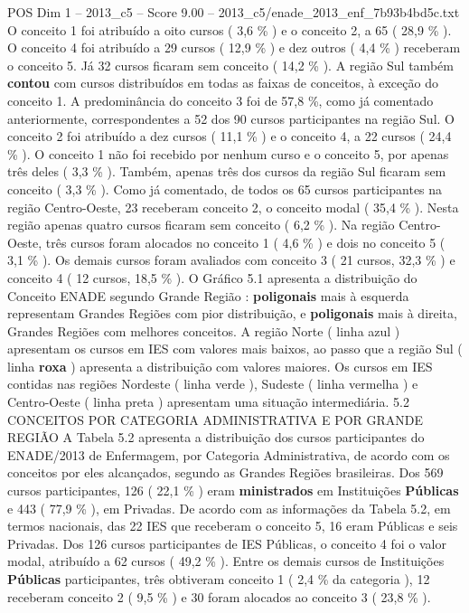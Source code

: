 \begin{textsample}{POS Dim 1 – 2013\_c5 – Score 9.00 – 2013\_c5/enade\_2013\_enf\_7b93b4bd5c.txt}
O conceito 1 foi atribuído a oito cursos ( 3,6 \% ) e o conceito 2, a 65 ( 28,9 \% ).
O conceito 4 foi atribuído a 29 cursos ( 12,9 \% ) e dez outros ( 4,4 \% ) receberam o conceito 5.
Já 32 cursos ficaram sem conceito ( 14,2 \% ).
A região Sul também \textbf{contou} com cursos distribuídos em todas as faixas de conceitos, à exceção do conceito 1.
A predominância do conceito 3 foi de 57,8 \%, como já comentado anteriormente, correspondentes a 52 dos 90 cursos participantes na região Sul.
O conceito 2 foi atribuído a dez cursos ( 11,1 \% ) e o conceito 4, a 22 cursos ( 24,4 \% ).
O conceito 1 não foi recebido por nenhum curso e o conceito 5, por apenas três deles ( 3,3 \% ).
Também, apenas três dos cursos da região Sul ficaram sem conceito ( 3,3 \% ).
Como já comentado, de todos os 65 cursos participantes na região Centro-Oeste, 23 receberam conceito 2, o conceito modal ( 35,4 \% ).
Nesta região apenas quatro cursos ficaram sem conceito ( 6,2 \% ).
Na região Centro-Oeste, três cursos foram alocados no conceito 1 ( 4,6 \% ) e dois no conceito 5 ( 3,1 \% ).
Os demais cursos foram avaliados com conceito 3 ( 21 cursos, 32,3 \% ) e conceito 4 ( 12 cursos, 18,5 \% ).
O Gráfico 5.1 apresenta a distribuição do Conceito ENADE segundo Grande Região : \textbf{poligonais} mais à esquerda representam Grandes Regiões com pior distribuição, e \textbf{poligonais} mais à direita, Grandes Regiões com melhores conceitos.
A região Norte ( linha azul ) apresentam os cursos em IES com valores mais baixos, ao passo que a região Sul ( linha \textbf{roxa} ) apresenta a distribuição com valores maiores.
Os cursos em IES contidas nas regiões Nordeste ( linha verde ), Sudeste ( linha vermelha ) e Centro-Oeste ( linha preta ) apresentam uma situação intermediária. 5.2 CONCEITOS POR CATEGORIA ADMINISTRATIVA E POR GRANDE REGIÃO A Tabela 5.2 apresenta a distribuição dos cursos participantes do ENADE/2013 de Enfermagem, por Categoria Administrativa, de acordo com os conceitos por eles alcançados, segundo as Grandes Regiões brasileiras.
Dos 569 cursos participantes, 126 ( 22,1 \% ) eram \textbf{ministrados} em Instituições \textbf{Públicas} e 443 ( 77,9 \% ), em Privadas.
De acordo com as informações da Tabela 5.2, em termos nacionais, das 22 IES que receberam o conceito 5, 16 eram Públicas e seis Privadas.
Dos 126 cursos participantes de IES Públicas, o conceito 4 foi o valor modal, atribuído a 62 cursos ( 49,2 \% ).
Entre os demais cursos de Instituições \textbf{Públicas} participantes, três obtiveram conceito 1 ( 2,4 \% da categoria ), 12 receberam conceito 2 ( 9,5 \% ) e 30 foram alocados ao conceito 3 ( 23,8 \% ).

\end{textsample}
